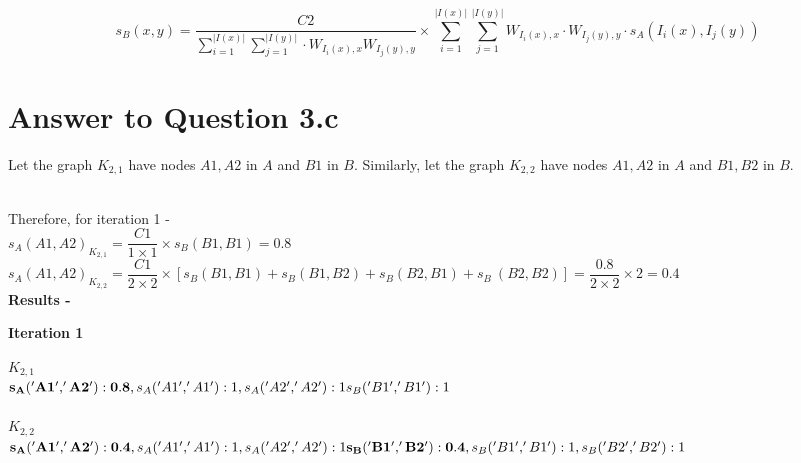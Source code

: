 \documentclass[11pt]{article}
\begin{document}
{\begin{small}
\begin{equation}
s_B (x, y) = \dfrac{C2}{\sum_{i=1}^{|I(x)|} \sum_{j=1}^{|I(y)|} \cdot W_{I_i(x), x} W_{I_j(y), y}} \times
\sum_{i=1}^{|I(x)|} \sum_{j=1}^{|I(y)|} W_{I_i(x), x} \cdot W_{I_j(y), y} \cdot s_A(I_i(x), I_j (y ))
\end{equation}
\end{small}


\pagebreak[4]
\section*{Answer to Question 3.c}

Let the graph $K_{2,1}$ have nodes ${A1, A2}$ in $A$ and ${B1}$ in $B$. Similarly, let the graph $K_{2,2}$ have nodes ${A1, A2}$ in $A$ and ${B1, B2}$ in $B$.\\\

Therefore, for iteration 1 - \\
$s_A (A1,A2)_{K_{2,1}} = \dfrac{C1}{1 \times 1} \times s_B (B1,B1) = 0.8$\\

$s_A (A1,A2)_{K_{2,2}} = \dfrac{C1}{2 \times 2} \times [s_B (B1,B1) + s_B (B1,B2) + s_B (B2,B1) +s_B \ (B2,B2)] = \dfrac{0.8}{2\times2} \times 2 = 0.4$\\

\textbf{Results -} 

\textbf{Iteration 1}
\begin{multicols}{2}
$K_{2,1}$\\
$\mathbf{s_A('A1', 'A2'): 0.8},\\
s_A('A1', 'A1'): 1,\\
s_A('A2', 'A2'): 1\\
s_B('B1', 'B1'): 1$\\
\columnbreak \\
$K_{2,2}$\\
$\mathbf{s_A('A1', 'A2'): 0.4},\\
s_A('A1', 'A1'): 1,\\
s_A('A2', 'A2'): 1\\
\mathbf{s_B('B1', 'B2'): 0.4},\\
s_B('B1', 'B1'): 1,\\
s_B('B2', 'B2'): 1$
\end{multicols}

}
\end{document}
